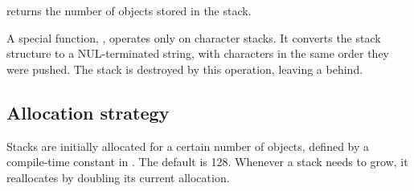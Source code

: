  returns the number of objects stored
in the stack. 

A special function, , operates
only on character stacks. It converts the stack structure to a
NUL-terminated string, with characters in the same order they were
pushed. The stack is destroyed by this operation, leaving a
 behind.

\subsection{Allocation strategy}

Stacks are initially allocated for a certain number of objects,
defined by a compile-time constant  in
. The default is 128. Whenever a stack needs to grow,
it reallocates by doubling its current allocation.


